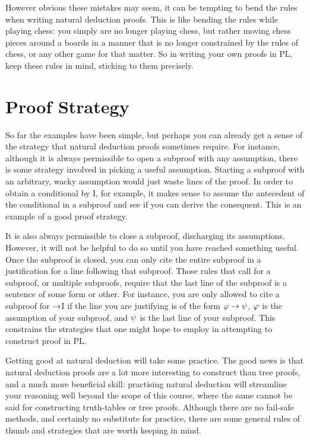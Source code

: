 However obvious these mistakes may seem, it can be tempting to bend the rules when writing natural deduction proofs.
This is like bending the rules while playing chess: you simply are no longer playing chess, but rather moving chess pieces around a boards in a manner that is no longer constrained by the rules of chess, or any other game for that matter.
So in writing your own proofs in PL, keep these rules in mind, sticking to them precisely.




\section{Proof Strategy}
\label{sec.PL.ND.strategy}

So far the examples have been simple, but perhaps you can already get a sense of the strategy that natural deduction proofs sometimes require.
For instance, although it is always permissible to open a subproof with any assumption, there is some strategy involved in picking a useful assumption.
Starting a subproof with an arbitrary, wacky assumption would just waste lines of the proof.
In order to obtain a conditional by {\eif}I, for example, it makes sense to assume the antecedent of the conditional in a subproof and see if you can derive the consequent.
This is an example of a good proof strategy.

It is also always permissible to close a subproof, discharging its assumptions.
However, it will not be helpful to do so until you have reached something useful.
Once the subproof is closed, you can only cite the entire subproof in a justification for a line following that subproof.
Those rules that call for a subproof, or multiple subproofs, require that the last line of the subproof is a sentence of some form or other.
For instance, you are only allowed to cite a subproof for $\rightarrow$I if the line you are justifying is of the form $\varphi \rightarrow \psi$, $\varphi$ is the assumption of your subproof, and $\psi$ is the last line of your subproof.
This constrains the strategies that one might hope to employ in attempting to construct proof in PL.

Getting good at natural deduction will take some practice.
The good news is that natural deduction proofs are a lot more interesting to construct than tree proofs, and a much more beneficial skill: practising natural deduction will streamline your reasoning well beyond the scope of this course, where the same cannot be said for constructing truth-tables or tree proofs.
Although there are no fail-safe methods, and certainly no substitute for practice, there are some general rules of thumb and strategies that are worth keeping in mind.


